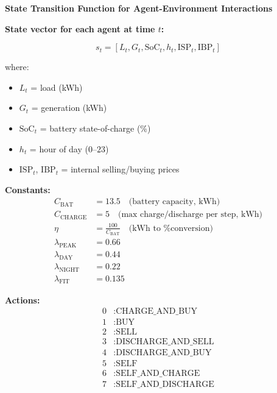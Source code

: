 \documentclass[preprint,12pt]{elsarticle}
\begin{document}
\textbf{State Transition Function for Agent-Environment Interactions}

\textbf{State vector for each agent at time $t$:}

\[
s_t = [L_t, G_t, \mathrm{SoC}_t, h_t, \mathrm{ISP}_t, \mathrm{IBP}_t]
\]

where:
\begin{itemize}
    \item $L_t$ = load (kWh)
    \item $G_t$ = generation (kWh)
    \item $\mathrm{SoC}_t$ = battery state-of-charge (\%)
    \item $h_t$ = hour of day ($0$--$23$)
    \item $\mathrm{ISP}_t$, $\mathrm{IBP}_t$ = internal selling/buying prices
\end{itemize}

\textbf{Constants:}
\begin{align*}
    C_{\text{BAT}} &= 13.5 \quad \text{(battery capacity, kWh)} \\
    C_{\text{CHARGE}} &= 5 \quad \text{(max charge/discharge per step, kWh)} \\
    \eta &= \frac{100}{C_{\text{BAT}}} \quad \text{(kWh to \% conversion)} \\
    \lambda_{\text{PEAK}} &= 0.66 \\
    \lambda_{\text{DAY}} &= 0.44 \\
    \lambda_{\text{NIGHT}} &= 0.22 \\
    \lambda_{\text{FIT}} &= 0.135
\end{align*}


\textbf{Actions:}
\begin{align*}
    0 &: \text{CHARGE\_AND\_BUY} \\
    1 &: \text{BUY} \\
    2 &: \text{SELL} \\
    3 &: \text{DISCHARGE\_AND\_SELL} \\
    4 &: \text{DISCHARGE\_AND\_BUY} \\
    5 &: \text{SELF} \\
    6 &: \text{SELF\_AND\_CHARGE} \\
    7 &: \text{SELF\_AND\_DISCHARGE}
\end{align*}
\end{document}
